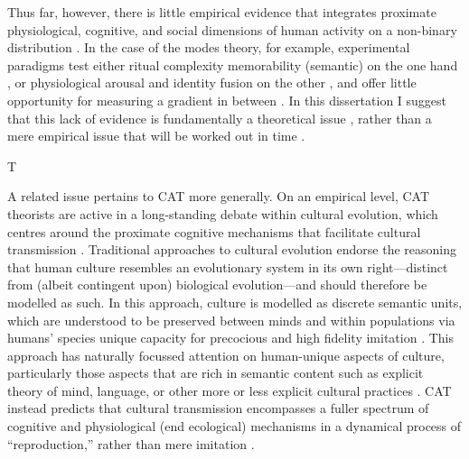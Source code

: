 \begin{CJK}{UTF8}{gbsn}
Thus far, however, there is little empirical evidence that integrates proximate physiological, cognitive, and social dimensions of human activity on a non-binary distribution \citep{Atran2010}.  In the case of the modes theory, for example, experimental paradigms test either ritual complexity memorability (semantic) on the one hand \citep{Whitehouse2005}, or physiological arousal and identity fusion on the other \citep{Whitehouse2014,Whitehouse2017,Swann2010a,Richert2005}, and offer little opportunity for measuring a gradient in between \citep[but see][]{Russell2014}.  In this dissertation I suggest that this lack of evidence is fundamentally a theoretical issue \citep{Clark2015}, rather than a mere empirical issue that will be worked out in time \citep[cf.][]{Whitehouse2014a}.

T%

A related issue pertains to CAT more generally.  On an empirical level, CAT theorists are active in a long-standing debate within cultural evolution, which centres around the proximate cognitive mechanisms that facilitate cultural transmission \citep{Acerbi2015,Scott-Phillips2018}.  Traditional approaches to cultural evolution endorse the reasoning that human culture resembles an evolutionary system in its own right---distinct from (albeit contingent upon) biological evolution---and should therefore be modelled as such.  In this approach, culture is modelled as discrete semantic units, which are understood to be preserved between minds and within populations via humans' species unique capacity for precocious and high fidelity imitation \citep[i.e., like genes, culture is preserved through processes of exact replication with natural copying error and drift][]{Henrich2003,Tomasello2011}. This approach has naturally focussed attention on human-unique aspects of culture, particularly those aspects that are rich in semantic content such as explicit theory of mind, language, or other more or less explicit cultural practices \citep{Tomasello2005}.  CAT instead predicts that cultural transmission encompasses a fuller spectrum of cognitive and physiological (end ecological) mechanisms in a dynamical process of ``reproduction,'' rather than mere imitation \citep{Claidiere2007,Mesoudi2017}.


\end{CJK}
